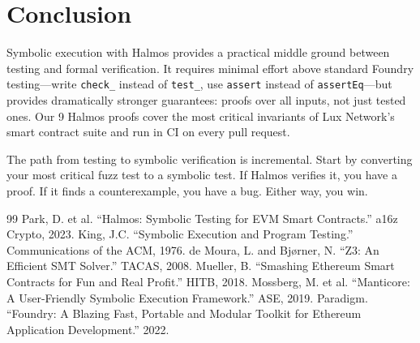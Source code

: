 \section{Conclusion}


Symbolic execution with Halmos provides a practical middle ground between testing and
formal verification. It requires minimal effort above standard Foundry testing---write
\texttt{check\_} instead of \texttt{test\_}, use \texttt{assert} instead of
\texttt{assertEq}---but provides dramatically stronger guarantees: proofs over all
inputs, not just tested ones. Our 9 Halmos proofs cover the most critical invariants of
Lux Network's smart contract suite and run in CI on every pull request.

The path from testing to symbolic verification is incremental. Start by converting your
most critical fuzz test to a symbolic test. If Halmos verifies it, you have a proof.
If it finds a counterexample, you have a bug. Either way, you win.

\begin{thebibliography}{99}
 Park, D. et al. ``Halmos: Symbolic Testing for EVM Smart Contracts.'' a16z Crypto, 2023.
 King, J.C. ``Symbolic Execution and Program Testing.'' Communications of the ACM, 1976.
 de Moura, L. and Bj{\o}rner, N. ``Z3: An Efficient SMT Solver.'' TACAS, 2008.
 Mueller, B. ``Smashing Ethereum Smart Contracts for Fun and Real Profit.'' HITB, 2018.
 Mossberg, M. et al. ``Manticore: A User-Friendly Symbolic Execution Framework.'' ASE, 2019.
 Paradigm. ``Foundry: A Blazing Fast, Portable and Modular Toolkit for Ethereum Application Development.'' 2022.
\end{thebibliography}

